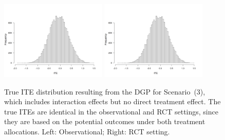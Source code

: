 \begin{figure}[htbp]
\centering
\includegraphics[width=0.45\textwidth]{img/results/observ_scenario3_ite_distribution_dgp.png}
\includegraphics[width=0.45\textwidth]{img/results/rct_scenario3_ite_distribution_dgp.png}
\caption{True ITE distribution resulting from the DGP for Scenario~(3), which includes interaction effects but no direct treatment effect. The true ITEs are identical in the observational and RCT settings, since they are based on the potential outcomes under both treatment allocations. Left: Observational; Right: RCT setting.}
\label{fig:scenario3_ite_distribution_dgp}
\end{figure}



